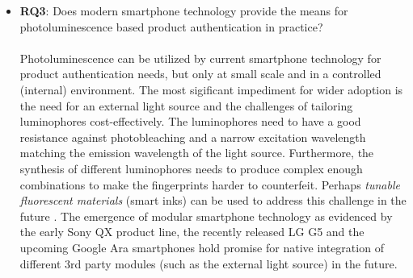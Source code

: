 \documentclass[thesis.tex]{subfiles}
\begin{document}
\begin{itemize}[label=, leftmargin=*]
  \item \textbf{RQ3}: Does modern smartphone technology provide the means for photoluminescence based product authentication in practice?\\\\
  Photoluminescence can be utilized by current smartphone technology for product authentication needs, but only at small scale and in a controlled (internal) environment. The most sigificant impediment for wider adoption is the need for an external light source and the challenges of tailoring luminophores cost-effectively. The luminophores need to have a good resistance against photobleaching and a narrow excitation wavelength matching the emission wavelength of the light source. Furthermore, the synthesis of different luminophores needs to produce complex enough combinations to make the fingerprints harder to counterfeit. Perhaps \emph{tunable fluorescent materials} (smart inks) can be used to address this challenge in the future \cite{smart_ink}. The emergence of modular smartphone technology as evidenced by the early Sony QX product line, the recently released LG G5 and the upcoming Google Ara smartphones hold promise for native integration of different 3rd party modules (such as the external light source) in the future.
\end{itemize}
\end{document}
